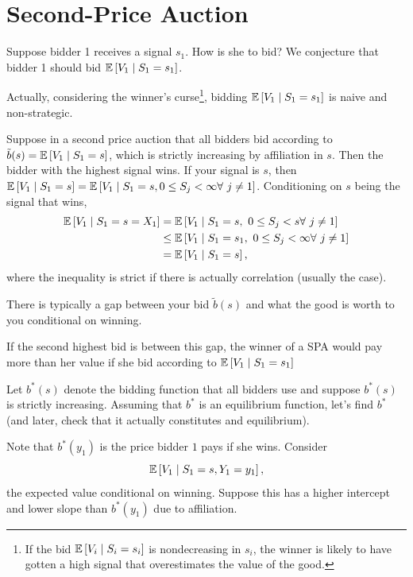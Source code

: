 \section{Second-Price Auction}
Suppose bidder 1 receives a signal $s_1$. How is she to bid?
We conjecture that bidder 1 should bid $\mathbb{E}\left[V_1 \mid S_1 = s_1\right] $.

Actually, considering the winner's curse\footnote{If the bid $\mathbb{E}\left[V_i \mid S_i = s_i\right] $ is nondecreasing in $s_i$, the winner is likely to have gotten a high signal that overestimates the value of the good.}, bidding $\mathbb{E}\left[V_1 \mid S_1 = s_1\right] $ is naive and non-strategic.

\begin{definition}
	Suppose in a second price auction that all bidders bid according to $\tilde{b}(s) = \mathbb{E}\left[V_1 \mid S_1 = s\right]$, which is strictly increasing by affiliation in $s$. Then the bidder with the highest signal wins. If your signal is $s$, then $\mathbb{E}\left[V_1 \mid S_1 = s\right] = \mathbb{E}\left[V_1 \mid S_1 = s, 0 \le S_j < \infty \forall\  j \ne 1\right]$. Conditioning on $s$ being the signal that wins, \begin{align*}
		\mathbb{E}\left[V_1 \mid S_1 = s = X_1\right] &= \mathbb{E}\left[V_1 \mid S_1 = s,\ 0 \le S_j < s \forall\  j \ne 1\right] \\
													 &\le \mathbb{E}\left[V_1 \mid S_1 = s_1, \ 0 \le S_j < \infty \forall\  j\ne 1\right] \\
													 &= \mathbb{E}\left[V_1 \mid S_1 = s\right] 
	,\end{align*} 
	where the inequality is strict if there is actually correlation (usually the case).

	There is typically a gap between your bid $\tilde{b}(s)$ and what the good is worth to you conditional on winning.
\end{definition}

If the second highest bid is between this gap, the winner of a SPA would pay more than her value if she bid according to $\mathbb{E}\left[V_1 \mid S_1 = s_1\right] $

Let $b^*(s)$ denote the bidding function that all bidders use and suppose $b^*(s)$ is strictly increasing. Assuming that $b^*$ is an equilibrium function, let's find $b^*$ (and later, check that it actually constitutes and equilibrium).

	Note that $b^*(y_1)$ is the price bidder $1$ pays if she wins.
	Consider
	\[
		\mathbb{E}\left[V_1 \mid S_1 = s, Y_1 = y_1\right],
	\]
	the expected value conditional on winning.
	Suppose this has a higher intercept and lower slope than $b^*(y_1)$ due to affiliation.

